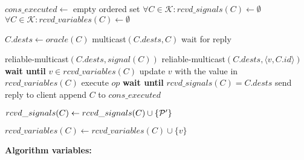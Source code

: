 \begin{algorithm}[h!]
\small
\begin{distribalgo}[1]
\vspace{1mm}

    \STATE $cons\_executed \leftarrow$ empty ordered set
    \STATE $\forall C \in \mathcal{K} : rcvd\_signals(C) \leftarrow \emptyset$
    \STATE $\forall C \in \mathcal{K} : rcvd\_variables(C) \leftarrow \emptyset$
\ENDINDENT

\vspace{1.25mm}
    \STATE $C.dests \leftarrow oracle(C)$ \label{algline:oracle} 
	\STATE multicast$(C.dests, C)$ \label{algline:climcast}
	\STATE wait for reply
\ENDINDENT

\vspace{1.25mm}
	    \STATE reliable-multicast$(C.dests, signal(C))$ \label{algline:mcastsignals}
			        \STATE reliable-multicast$(C.dests, \langle v, C.id \rangle)$ \label{algline:multicastv}
			    \ELSE
			        \STATE \textbf{wait until} $v \in rcvd\_variables(C)$ \label{algline:waitvariable}
			        \STATE update $v$ with the value in $rcvd\_variables(C)$
			    \ENDIF
			\ENDIF
			\STATE execute $op$ \label{algline:executeopck}
		\ENDFOR
		\STATE \textbf{wait until} $rcvd\_signals(C) = C.dests$ \label{algline:waitsignals}
		\STATE send reply to client \label{algline:sendreply}
		\STATE append $C$ to $cons\_executed$
	\ENDINDENT
	
	\vspace{1.25mm}
	    \STATE $rcvd\_signals(C) \leftarrow rcvd\_signals(C) \cup \{\mathcal{P}'\}$
	\ENDINDENT

	\vspace{1.25mm}
	    \STATE $rcvd\_variables(C) \leftarrow rcvd\_variables(C) \cup \{v\}$
	\ENDINDENT
			
\ENDINDENT

\vspace{1.7mm}

\textbf{Algorithm variables:}


\end{distribalgo}
\end{algorithm}
